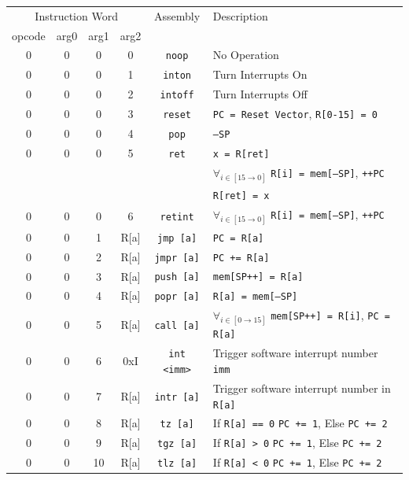 \documentclass{article}
\begin{document}
\begin{table}[h!]
	\centering
	\begin{footnotesize}
		\begin{tabular}{cccc|c|l}
			\hline
			\multicolumn{4}{c|}{Instruction Word} & Assembly & Description \\
			opcode & arg0 & arg1 & arg2 & & \\
			\hline
			0 & 0 & 0 & 0 & \texttt{noop} & No Operation \\
			0 & 0 & 0 & 1 & \texttt{inton} & Turn Interrupts On \\
			0 & 0 & 0 & 2 & \texttt{intoff} & Turn Interrupts Off \\
			0 & 0 & 0 & 3 & \texttt{reset} & \texttt{PC = Reset Vector}, \texttt{R[0-15] = 0} \\
			0 & 0 & 0 & 4 & \texttt{pop} & \texttt{--SP} \\
			0 & 0 & 0 & 5 & \texttt{ret} & \texttt{x = R[ret]} \\
			{} & {} & {} & {} & {} & $\forall_{i \in [15 \rightarrow 0]}$ \texttt{R[i] = mem[--SP]}, \texttt{++PC} \\
			{} & {} & {} & {} & {} & \texttt{R[ret] = x} \\
			0 & 0 & 0 & 6 & \texttt{retint} & $\forall_{i \in [15 \rightarrow 0]}$ \texttt{R[i] = mem[--SP]}, \texttt{++PC} \\
			0 & 0 & 1 & R[a] & \texttt{jmp [a]} & \texttt{PC = R[a]} \\
			0 & 0 & 2 & R[a] & \texttt{jmpr [a]} & \texttt{PC += R[a]} \\
			0 & 0 & 3 & R[a] & \texttt{push [a]} & \texttt{mem[SP++] = R[a]} \\
			0 & 0 & 4 & R[a] & \texttt{popr [a]} & \texttt{R[a] = mem[--SP]} \\
			0 & 0 & 5 & R[a] & \texttt{call [a]} & $\forall_{i \in [0 \rightarrow 15]}$
			 \texttt{mem[SP++] = R[i]}, \texttt{PC = R[a]} \\
 			0 & 0 & 6 & 0xI & \texttt{int <imm>} & Trigger software interrupt number \texttt{imm} \\
 			0 & 0 & 7 & R[a] & \texttt{intr [a]} & Trigger software interrupt number in \texttt{R[a]} \\
 			0 & 0 & 8 & R[a] & \texttt{tz [a]} & If \texttt{R[a] == 0} \texttt{PC += 1}, Else \texttt{PC += 2} \\
 			0 & 0 & 9 & R[a] & \texttt{tgz [a]} & If \texttt{R[a] > 0} \texttt{PC += 1}, Else \texttt{PC += 2} \\
 			0 & 0 & 10 & R[a] & \texttt{tlz [a]} & If \texttt{R[a] < 0} \texttt{PC += 1}, Else \texttt{PC += 2} \\

\end{tabular}
\end{footnotesize}
\end{table}
\end{document}
